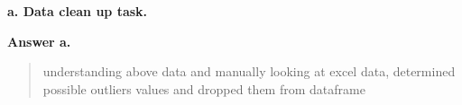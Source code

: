 \documentclass[
]{article}
\newenvironment{Shaded}{\begin{snugshade}}{\end{snugshade}}
\newcommand{\DataTypeTok}[1]{\textcolor[rgb]{0.13,0.29,0.53}{#1}}
\newcommand{\DecValTok}[1]{\textcolor[rgb]{0.00,0.00,0.81}{#1}}
\newcommand{\KeywordTok}[1]{\textcolor[rgb]{0.13,0.29,0.53}{\textbf{#1}}}
\newcommand{\NormalTok}[1]{#1}
\newcommand{\OperatorTok}[1]{\textcolor[rgb]{0.81,0.36,0.00}{\textbf{#1}}}
\newcommand{\StringTok}[1]{\textcolor[rgb]{0.31,0.60,0.02}{#1}}
\begin{document}
\textbf{a. Data clean up task. }

\textbf{Answer a. }

\begin{quote}
understanding above data and manually looking at excel data, determined
possible outliers values and dropped them from dataframe
\end{quote}

\begin{Shaded}
\end{Shaded}
\end{document}
